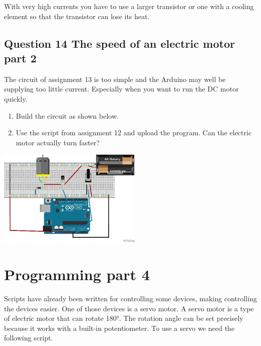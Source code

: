 \documentclass{arduino}
\begin{document}
With very high currents you have to use a larger transistor or one with a cooling element so that the transistor can lose its heat.

\subsection{Question 14 The speed of an electric motor part 2}

The circuit of assignment 13 is too simple and the Arduino may well be supplying too little current. Especially when you want to run the DC motor quickly.

\begin{enumerate}[label={\alph*})]
\item Build the circuit as shown below.

\item Use the script from assignment 12 and upload the program. Can the electric motor actually turn faster?
\end{enumerate}

\begin{center}
\includegraphics[width=0.8\linewidth]{33. Circuit motor control (large current)}
\end{center}

\newpage

\section{Programming part 4}


Scripts have already been written for controlling some devices, making controlling the devices easier. One of those devices is a servo motor. A servo motor is a type of electric motor that can rotate \ang{180}. The rotation angle can be set precisely because it works with a built-in potentiometer. To use a servo we need the following script.
\end{document}
